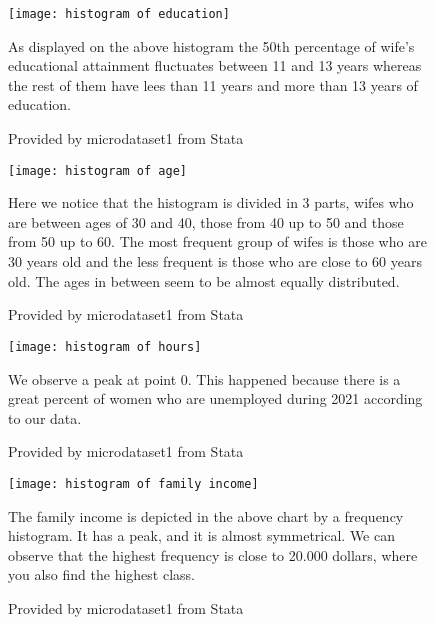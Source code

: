 \documentclass[10pt,towside,a4paper]{article}
\begin{document}
\begin{figure}[H]
	\begin{Center}
	\texttt{[image: histogram of education]}
	\caption{Provided by microdataset1 from Stata}
	\label{fig:histogram of education}
	\end{Center}
	\vspace {0.5\baselineskip}
	
	As displayed on the above histogram the 50th percentage of wife’s educational attainment fluctuates between 11 and 13 years whereas the rest of them have lees than 11 years and more than 13 years of education.
\end{figure}
	\vspace {0.5\baselineskip}

\begin{figure}[H]
	\begin{Center}
	\texttt{[image: histogram of age]}
	\caption{Provided by microdataset1 from Stata}
	\label{fig:histogram of age}
	\end{Center}
	\vspace {0.5\baselineskip}


	Here we notice that the histogram is divided in 3 parts, wifes who are between ages of 30 and 40, those from 40 up to 50 and those from 50 up to 60. The most frequent group of wifes is those who are 30 years old and the less frequent is those who are close to 60 years old. The ages in between seem to be almost equally distributed.
\end{figure}
	\vspace {0.5\baselineskip}
	
\begin{figure}[H]
	\begin{Center}
	\texttt{[image: histogram of hours]}
	\caption{Provided by microdataset1 from Stata}
	\label{fig:histogram of hours}
	\end{Center}
	\vspace {0.5\baselineskip}

	We observe a peak at point 0. This happened because there is a great percent of women who are unemployed during 2021 according to our data. 
\end{figure}
	\vspace {0.5\baselineskip}
	
\begin{figure}[H]
	\begin{Center}
	\texttt{[image: histogram of family income]}
	\caption{Provided by microdataset1 from Stata}
	\label{fig:histogram of family income}
	\end{Center}
	\vspace {0.5\baselineskip}
	
	The family income is depicted in the above chart by a frequency histogram. It has a peak, and it is almost symmetrical. We can observe that the highest frequency is close to 20.000 dollars, where you also find the highest class. 
\end{figure}
	\vspace {0.5\baselineskip}
\end{document}
